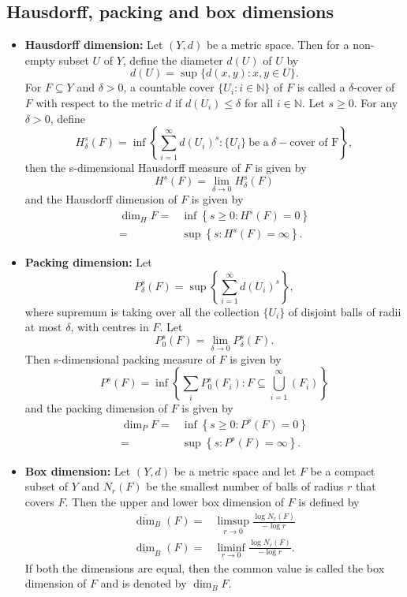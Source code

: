\documentclass[10pt]{amsart}
\theoremstyle{definition}
\begin{document}
	\subsection{Hausdorff, packing and box dimensions}
	\begin{itemize}
		\item\textbf{Hausdorff dimension:} Let $(Y,d)$ be a metric space. Then for a non-empty subset $U$ of $Y$,  define the diameter $d(U)$ of $U$ by
		$$d(U)=\sup\{d(x,y): x,y \in U \}.$$
		For $F\subseteq Y$ and $\delta>0$, a countable cover $\{U_i:i\in \mathbb{N}\}$ of $F$ is called a $\delta$-cover of $F$ with respect to the metric $d$ if $d(U_i)\leq \delta$ for all $i\in \mathbb{N}$.
		Let $s\geq 0$. For any $\delta>0$,  define
		$$H_\delta^s(F)=\inf \left \{ \sum_{i=1}^{\infty}d(U_i)^s: \{U_i\}~ \mbox{be a}    ~\delta -\mbox{cover of F} \right\},$$
		then the s-dimensional Hausdorff measure of $F$ is given by $$H^s(F)=\lim\limits_{\delta\rightarrow 0}H_\delta^s(F)$$ and the Hausdorff dimension of $F$ \cite{FG,FE}  is given by
		\begin{align*}
			\dim_HF=&\inf\left \{s\geq 0: H^s(F)=0\right\}\\
			=&\sup\left\{s : H^s(F)=\infty\right\}.
		\end{align*}
		\item\textbf{Packing dimension:} Let $$P_\delta^s(F)=\sup \left \{ \sum_{i=1}^{\infty}d(U_i)^s\right\},$$ where supremum is taking over all the collection $\{U_i\}$ of disjoint balls of radii at most $\delta$, with centres in $F$. Let $$P_0^s(F)=\lim\limits_{\delta\rightarrow 0}P_{\delta}^s(F).$$ Then s-dimensional packing measure of $F$ is given by $$P^s(F)=\inf\left\{\sum_{i}P_0^s(F_i):F\subseteq\bigcup_{i=1}^{\infty}(F_i)\right\}$$ and the packing dimension of $F$ \cite{FG}  is given by
		\begin{align*}
			\dim_PF=&\inf\left \{s\geq 0: P^s(F)=0\right\}\\
			=&\sup\left\{s : P^s(F)=\infty\right\}.
		\end{align*}
		\item\textbf{Box dimension:} Let $(Y,d)$ be a metric space and let $F$ be a compact subset of $Y$ and $N_r(F)$ be the smallest number of  balls of radius $r$ that covers $F$. Then the upper and lower box dimension of $F$ is defined by
		\begin{align*}
			\overline{\dim}_B(F)=&\limsup\limits_{r\rightarrow 0}\frac{\log N_r(F)}{-\log r}\\ \underline{\dim}_B(F)=&\liminf\limits_{r\rightarrow 0}\frac{\log N_r(F)}{-\log r}.
		\end{align*}
		If both the dimensions are equal, then the common value is called the box dimension of $F$ \cite{FG,FE} and is denoted by $\dim_BF$.
	\end{itemize}
\end{document}
